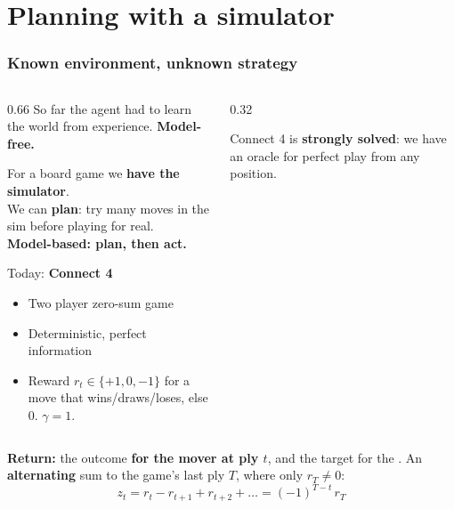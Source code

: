 
\date[\today]
{\today}

\frame{\titlepage}

\section{Planning with a simulator}

\begin{frame}
    \frametitle{Known environment, unknown strategy}
    \begin{columns}
    \begin{column}{0.66\linewidth}
    So far the agent had to learn the world from experience.
    \textbf{Model-free.}

    \vspace{0.15cm}
    For a board game we \textbf{have the simulator}. \\ 
    We can \textbf{plan}: try many moves in the sim
    before playing for real. \\
    \textbf{Model-based: plan, then act.}

    \vspace{0.15cm}
    Today: \textbf{Connect 4}
    \begin{itemize}
        \item Two player zero-sum game
        \item Deterministic, perfect information
        \item Reward $r_t \in \{+1,0,-1\}$ for a move that wins/draws/loses, else $0$. $\gamma=1$.
    \end{itemize}
    \end{column}
    \begin{column}{0.32\linewidth}
    \centering

    \vspace{0.15cm}
    \small
    Connect 4 is \textbf{strongly solved}: we have an oracle for perfect
    play from any position.
    \end{column}
    \end{columns}
    \textbf{Return:} the outcome \textbf{for the mover at ply $t$}, and the target for the .
    An \textbf{alternating} sum to the game's last ply $T$, where only $r_T \neq 0$:
    \vspace{-0.2cm}
    $$
    z_t = r_t - r_{t+1} + r_{t+2} + \ldots = (-1)^{T-t}\, r_T
    $$
\end{frame}


